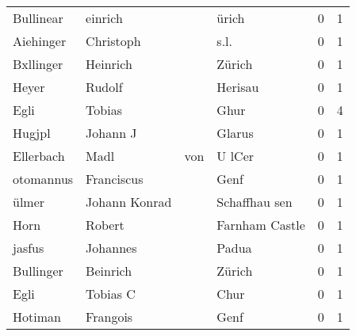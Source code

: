 \begin{tabular}{llllrr}
                Bullinear &                            einrich &             &                                       ürich &          0 &         1 \\
                Aiehinger &                          Christoph &             &                                        s.l. &          0 &         1 \\
                Bxllinger &                           Heinrich &             &                                      Zürich &          0 &         1 \\
                    Heyer &                             Rudolf &             &                                     Herisau &          0 &         1 \\
                     Egli &                             Tobias &             &                                        Ghur &          0 &         4 \\
                   Hugjpl &                           Johann J &             &                                      Glarus &          0 &         1 \\
                Ellerbach &                               Madl &         von &                                      U lCer &          0 &         1 \\
                otomannus &                         Franciscus &             &                                        Genf &          0 &         1 \\
                    ülmer &                      Johann Konrad &             &                               Schaffhau sen &          0 &         1 \\
                     Horn &                             Robert &             &                              Farnham Castle &          0 &         1 \\
                   jasfus &                           Johannes &             &                                       Padua &          0 &         1 \\
                Bullinger &                           Beinrich &             &                                      Zürich &          0 &         1 \\
                     Egli &                           Tobias C &             &                                        Chur &          0 &         1 \\
                  Hotiman &                           Frangois &             &                                        Genf &          0 &         1 \\

\end{tabular}
